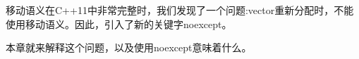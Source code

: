 移动语义在C++11中非常完整时，我们发现了一个问题:vector重新分配时，不能使用移动语义。因此，引入了新的关键字noexcept。\par

本章就来解释这个问题，以及使用noexcept意味着什么。\par